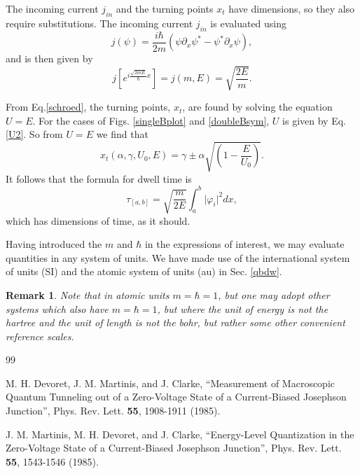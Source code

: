 \documentclass{article}
\newtheorem{remark}{Remark}
\numberwithin{equation}{section}
\begin{document}
{The incoming current $j_{in}$ and the turning points $x_t$ have dimensions, so they also require substitutions. The incoming current $j_{in}$ is evaluated using
\begin{equation}
\label{j}
j(\psi)=\frac{i\hbar}{2m}\left(\psi\partial_x\psi^\ast-\psi^\ast\partial_x\psi\right),
\end{equation}
and is then given by
\begin{equation}
\label{jinmh}
j\left[e^{i\frac{\sqrt{2mE}}{\hbar}x}\right]=j(m,E)=\sqrt{\frac{2E}{m}}.
\end{equation}

From Eq.\eqref{schroed}, the turning points, $x_t$, are found by solving the equation $U=E$.  For the  cases of Figs. \ref{singleBplot} and \ref{doubleBsym}, $U$ is given by Eq. \eqref{U2}.  So from $U=E$ we find that
\begin{equation}
\label{xt}
x_t(\alpha, \gamma, U_0, E)=\gamma\pm\alpha\sqrt{\left(1-\frac{E}{U_0}\right)}.
\end{equation}
It follows that the formula for dwell time is
\begin{equation}
\label{tauanyU}
\tau_{\left[a,b\right]}=\sqrt{\frac{m}{2E}}\int_{a}^{b}\vert\varphi_i\vert^2dx,
\end{equation}
which has dimensions of time, as it should.

Having introduced the $m$ and $\hbar$ in the expressions of interest, we may evaluate quantities in any system of units.  We have made use of the international system of units (SI) and the atomic system of units (au) in Sec. \ref{qbdw}.\\

\begin{remark}\label{m=h}
Note that in atomic units $m=\hbar=1$, but one may adopt other systems which also have $m=\hbar=1$, but where the unit of energy is not the hartree and the unit of length is not the bohr, but rather some other convenient reference scales.
\end{remark}

\begin{thebibliography}{99}

 M. H. Devoret, J. M. Martinis, and J. Clarke, ``Measurement of Macroscopic Quantum Tunneling out of a Zero-Voltage State of a Current-Biased Josephson Junction'', Phys. Rev. Lett. \textbf{55}, 1908-1911 (1985).

 J. M. Martinis, M. H. Devoret, and J. Clarke, ``Energy-Level Quantization in the Zero-Voltage State of a Current-Biased Josephson Junction'', Phys. Rev. Lett. \textbf{55}, 1543-1546 (1985).


\end{thebibliography}}
\end{document}
